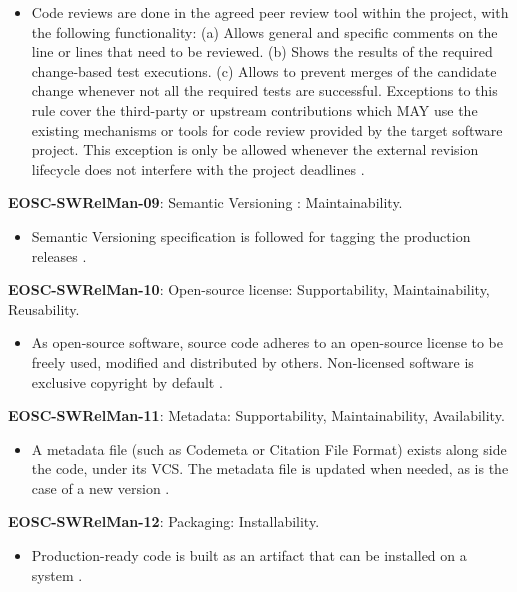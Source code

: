 \begin{itemize}
    \item Code reviews are done in the agreed peer review tool within the project, with the following  functionality: (a) Allows general and specific comments on the line or lines that need to be reviewed. (b) Shows the results of the required change-based test executions. (c) Allows to prevent merges of the candidate change whenever not all the required tests are successful. Exceptions to this rule cover the third-party or upstream contributions which MAY use the existing mechanisms or tools for code review provided by the target software project. This exception is only be allowed whenever the external revision lifecycle does not interfere with the project deadlines \cite{srisopha_software_2018,aberdour_achieving_2007,zuser_software_2005,orviz_set_2017}.
\end{itemize}

\textbf{EOSC-SWRelMan-09}: Semantic Versioning : Maintainability.

\begin{itemize}
    \item Semantic Versioning specification is followed for tagging the production releases \cite{orviz_set_2017,raymond_software_2013}.
\end{itemize}

\textbf{EOSC-SWRelMan-10}: Open-source license: Supportability, Maintainability, Reusability.

\begin{itemize}
    \item As open-source software, source code adheres to an open-source license to be freely used, modified and distributed by others. Non-licensed software is exclusive copyright by default \cite{orviz_set_2017,raymond_software_2013}.
\end{itemize}

\textbf{EOSC-SWRelMan-11}: Metadata: Supportability, Maintainability, Availability.

\begin{itemize}
    \item A metadata file (such as Codemeta or Citation File Format) exists along side the code, under its VCS. The metadata file is updated when needed, as is the case of a new version \cite{orviz_set_2017}.
\end{itemize}

\textbf{EOSC-SWRelMan-12}: Packaging: Installability.

\begin{itemize}
    \item Production-ready code is  built as an artifact that can be installed on a system \cite{shepherdson_cessda_2019,orviz_set_2017,raymond_software_2013}.
\end{itemize}

